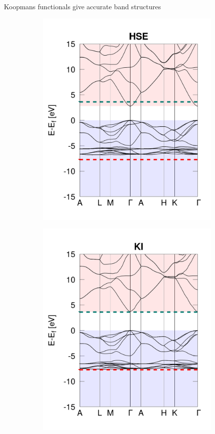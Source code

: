 \documentclass[xcolor=table,aspectratio=169]{beamer}
\numberwithin{equation}{section}
\begin{document}
\begin{frame}{\normalsize Koopmans functionals give accurate band structures}
\begin{figure}[t]
\begin{subfigure}{0.25\textwidth}
         \includegraphics[width=\columnwidth]{figures/ZnO_hse.png}
      \end{subfigure}
      \begin{subfigure}{0.25\textwidth}
         \includegraphics[width=\columnwidth]{figures/ZnO_ki.png}

\end{subfigure}
\end{figure}
\end{frame}
\end{document}
